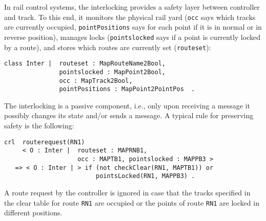 In rail control systems, the interlocking provides a safety layer
between controller and track.
%
%
To this end, it monitors the physical
rail yard (\verb|occ| says which tracks are currently occupied,
\verb|pointPositions| says for each point if it is in normal or in
reverse position), manages locks (\verb|pointslocked| says if a point
is currently locked by a route), and stores which routes are
currently set (\verb|routeset|):
%
\begin{lstlisting}[columns=fixed]
class Inter |  routeset : MapRouteName2Bool, 
               pointslocked : MapPoint2Bool,
               occ : MapTrack2Bool, 
               pointPositions : MapPoint2PointPos  .
\end{lstlisting}

The interlocking is a passive component, i.e., only upon receiving a
message it possibly changes its state and/or sends a message. A
typical rule for preserving safety is the following:
%
\begin{lstlisting}[columns=fixed]
crl  routerequest(RN1) 
     < O : Inter |  routeset : MAPRNB1, 
                    occ : MAPTB1, pointslocked : MAPPB3 >
   => < O : Inter | > if (not checkClear(RN1, MAPTB1)) or 
                         pointsLocked(RN1, MAPPB3) .
\end{lstlisting}
%
A route request by the controller is ignored in case that the tracks
specified in the clear table for route \verb|RN1| are occupied or the
points of route \verb|RN1| are locked in different positions. 
